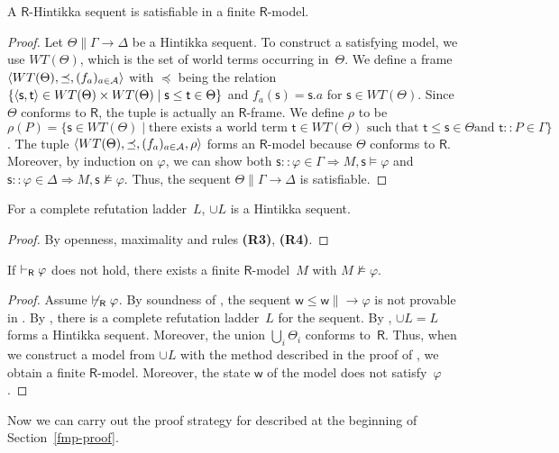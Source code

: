    \begin{proposition}
    \label{Hsat}
    A $\mathsf R$-Hintikka sequent is satisfiable in a finite $\mathsf R$-model.
   \end{proposition}
   \begin{proof}
    \newcommand{\W}{WT(\Theta)}
    Let $\Theta\parallel \Gamma\longrightarrow\Delta$ be a Hintikka sequent.
    To construct a satisfying model, we use $\W$,
    which is the set of world
    terms occurring in~$\Theta$.
    We define a frame $\tuple{\W, \preceq, (f_a)_{a\in\agents}}$ with
    $\preceq$ being the relation $\{\tuple{\mathsf s,\mathsf t}\in
    \W\times \W\mid
    \mathsf s\le
    \mathsf t\in\Theta\}$ and
    $f_a(\mathsf s) = \mathsf s.a$ for $\mathsf s\in\W$\enspace.
    Since $\Theta$ conforms to $\mathsf R$,
    the tuple is actually an $\mathsf R$-frame.
    We define $\rho$ to be $\rho(P) =
    \{\mathsf s\in \W\mid
    \mbox{there exists a world term } \mathsf t \in \W \mbox{ such that }
    \mathsf t\le
    \mathsf s \in \Theta\mbox{
    and }\mathsf t::P\in \Gamma\}$.
    The tuple $\tuple{\W,\preceq,(f_a)_{a\in \agents},\rho}$ forms
    an $\mathsf R$-model because $\Theta$ conforms to $\mathsf R$.
    Moreover, by induction on $\varphi$, we can show both
    $\mathsf s::\varphi\in\Gamma\Longrightarrow M,\mathsf s\models\varphi$
    and
    $\mathsf s::\varphi\in\Delta\Longrightarrow M,\mathsf s\not\models\varphi$.
    Thus, the sequent $\Theta\parallel \Gamma\longrightarrow\Delta$ is satisfiable.
   \end{proof}

   \begin{proposition}
    \label{completehintikka}
    For a complete refutation ladder~$L$,
    $\cup L$ is a Hintikka sequent.
   \end{proposition}
   \begin{proof}
    By openness, maximality and rules \textbf{(R3)}, \textbf{(R4)}.
   \end{proof}

   \begin{proposition}
    \label{R-fmp}
    If $\vdash_{\mathsf R}\varphi$  does not hold, there exists a finite $\mathsf
    R$-model~$M$ with $M\not\models\varphi$.
   \end{proposition}
   \begin{proof}
    Assume $\not\vdash_{\mathsf R}\varphi$.
    By soundness of \LB,
    the sequent $\mathsf w\le\mathsf w\parallel \longrightarrow\varphi$ is not
    provable in \LB.
    By ,
    there is a complete refutation ladder~$L$ for the sequent.
    By ,
    $\cup L = L$  forms a Hintikka
    sequent.
    Moreover,
    the union $\bigcup_i\Theta_i$ conforms to~$\mathsf
    R$.
    Thus, when we construct a model from $\cup L$ with the method described in
    the proof of ,
    we obtain a finite $\mathsf R$-model.
    Moreover, the state $\mathsf w$ of the model does not satisfy~$\varphi$.
   \end{proof}
   Now we can carry out the proof strategy for  described
   at the beginning of Section~\ref{fmp-proof}.

